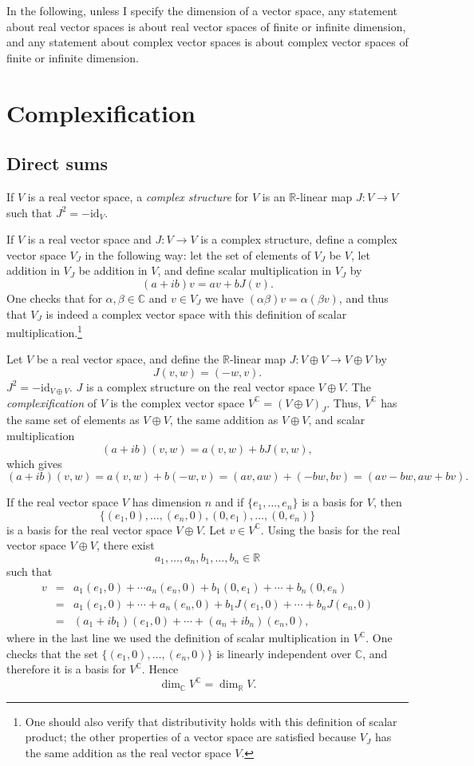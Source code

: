 \documentclass{article}
\newcommand{\id}{\textrm{id}}
\begin{document}
In the following, unless I specify the dimension of a vector space, any statement about real vector spaces is about real vector spaces of finite or infinite dimension, and any
statement about complex vector spaces is about complex vector spaces of finite or infinite dimension. 


\section{Complexification}
\subsection{Direct sums}
If $V$ is a real vector space, a {\em complex structure} for $V$ is an $\mathbb{R}$-linear map $J:V \to V$ such that $J^2=-\id_V$.

If $V$ is a real vector space and $J:V \to V$ is a complex structure,  define a complex vector space $V_J$ in the following way: let the set of elements of $V_J$ be $V$,
let addition in $V_J$ be addition in $V$, and define scalar multiplication in $V_J$ by 
\[
(a+ib)v=av+bJ(v).
\]
One checks that for $\alpha,\beta \in \mathbb{C}$ and $v \in V_J$ we have $(\alpha \beta)v=\alpha (\beta v)$, and thus
that $V_J$ is indeed a complex vector space with this definition of scalar multiplication.\footnote{One should also
verify that distributivity holds with this definition of scalar product; the other properties of a vector space are satisfied because $V_J$ has
the same addition as the real vector space $V$.}

 Let $V$ be a real vector space, and define the $\mathbb{R}$-linear map 
$J:V \oplus V \to V \oplus V$ by
\[
J(v,w)=(-w,v).
\]
$J^2=-\id_{V \oplus V}$. $J$ is a complex structure on the real vector space $V \oplus V$. 
The {\em complexification} of $V$
is the complex vector space $V^\mathbb{C}=(V \oplus V)_J$. 
Thus, $V^\mathbb{C}$ has the same set of elements as $V \oplus V$, the same addition as $V \oplus V$, and scalar multiplication
\[
(a+ib) (v,w)=a(v,w)+bJ(v,w),
\]
which gives
\[
(a+ib)(v,w)=a(v,w)+b(-w,v)=(av,aw)+(-bw,bv)=(av-bw,aw+bv).
\]

If the real vector space $V$ has dimension $n$ and
if $\{e_1,\ldots,e_n\}$ is a basis for $V$, then
\[
\{(e_1,0),\ldots,(e_n,0),(0,e_1),\ldots,(0,e_n)\}
\]
is a basis for the real vector space $V \oplus V$. 
Let $v \in V^\mathbb{C}$. Using the basis for the real vector space $V \oplus V$, there exist 
\[
a_1,\ldots,a_n,b_1,\ldots,b_n \in \mathbb{R}
\]
such that
\begin{eqnarray*}
v&=&a_1(e_1,0)+\cdots a_n(e_n,0)+b_1(0,e_1)+\cdots+b_n(0,e_n)\\
&=&a_1(e_1,0)+\cdots+a_n(e_n,0)+b_1J(e_1,0)+\cdots+b_n J(e_n,0)\\
&=&(a_1+ib_1)(e_1,0)+\cdots+(a_n+ib_n)(e_n,0),
\end{eqnarray*}
where in the last line we used the definition of scalar multiplication in $V^\mathbb{C}$. One checks that
the set $\{(e_1,0),\ldots,(e_n,0)\}$ is linearly independent over $\mathbb{C}$, and therefore it is a basis for $V^\mathbb{C}$. 
Hence
\[
\dim_\mathbb{C} V^\mathbb{C} = \dim_\mathbb{R} V.
\]
\end{document}
